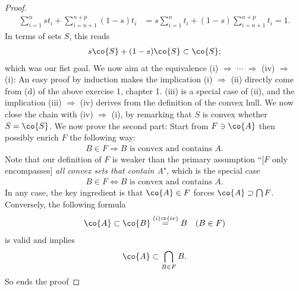 \begin{proof}
\begin{align}
  \sum_{i=1}^n st_i + \sum_{i=n+1}^{n+p} (1-s)t_i &= 
  s\sum_{i=1}^n t_i +(1-s) \sum_{i=n+1}^{n+p} t_i  = 1.
\end{align}
%
In terms of sets $S$, this reads %
\begin{align}
  s\co{S} + (1-s)\co{S} \subset \co{S}; 
\end{align}
which was our fist goal. %
We now aim at the equivalence %
%
(i) $\Rightarrow$ $\cdots$ $\Rightarrow$ (iv) $\Rightarrow$ (i): %
%
An easy proof by induction makes the implication (i) $\Rightarrow$ (ii) %
directly come from (d) of the above exercise 1, chapter 1. %
%
(iii) is a special case of (ii),
and the implication (iii) $\Rightarrow$ (iv) derives from the definition of %
the convex hull. %
%
We now close the chain with (iv) $\Rightarrow$ (i), %
by remarking that $S$ is convex whether $S = \co{S}$. %
%  
We now prove the second part: %
Start from $F\ni\co{A}$ then possibly enrich $F$ the following way: %
\begin{align}
  B \in F \Rightarrow B \text{ is convex and contains }A.
\end{align}
Note that our definition of $F$ is weaker than the primary assumption %
``[$F$ only encompasses] \textit{all convex sets that contain A}", %
which is the special case %
%
\begin{align}
  B \in F \Leftrightarrow B \text{ is convex and contains }A.
\end{align}
%
In any case, the key ingredient is that %
$\co{A} \in F$ forces $\co{A} \supset \bigcap F$. %
Conversely, the following formula %
%
\begin{align}
  \co{A} \subset \co{B} \overset{(i) \Rightarrow (iv)}{=} B \quad (B \in F) 
\end{align}
%
is valid and implies %
\begin{align}
  \co{A} \subset \bigcap_{B \in F} B. 
\end{align}
%
So ends the proof
\end{proof}
%